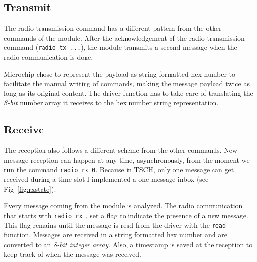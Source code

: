 %



\subsection{Transmit}

The radio transmission command has a different pattern from the other commands
of the module.
After the acknowledgement of the radio transmission command (\lstinline{radio tx ...}),
the module transmits a second message when the radio communication is done.



Microchip chose to represent the payload as string formatted hex number to
facilitate the manual writing of commands, making the message payload twice as
long as its original content.
The driver function has to take care of translating the \emph{8-bit} number
array it receives to the hex number string representation.

\subsection{Receive}

The reception also follows a different scheme from the other commands.
New message reception can happen at any time, asynchronously, from the moment
we run the command \lstinline{radio rx 0}.
Because in TSCH, only one message can get received during a time slot
I implemented a one message inbox (see Fig~\ref{fig:rxstate}).

Every message coming from the module is analyzed.
The radio communication that starts with \lstinline{radio rx }, set a flag to
indicate the presence of a new message.
This flag remains until the message is read from the driver with the
\lstinline{read} function.
Messages are received in a string formatted hex number and are converted to an
\emph{8-bit integer array}.
Also, a timestamp is saved at the reception to keep track of when the
message was received.

